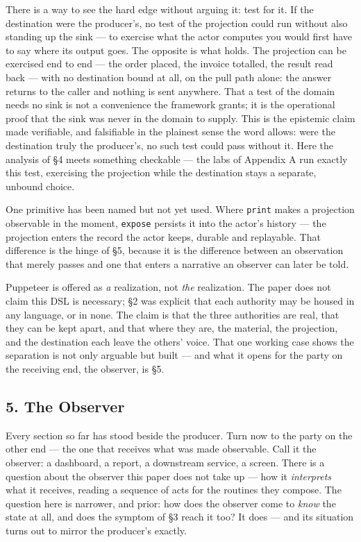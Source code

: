 \documentclass[
]{article}
\newcounter{none} %
\begin{document}
There is a way to see the hard edge without arguing it: test for it. If
the destination were the producer's, no test of the projection could run
without also standing up the sink --- to exercise what the actor
computes you would first have to say where its output goes. The opposite
is what holds. The projection can be exercised end to end --- the order
placed, the invoice totalled, the result read back --- with no
destination bound at all, on the pull path alone: the answer returns to
the caller and nothing is sent anywhere. That a test of the domain needs
no sink is not a convenience the framework grants; it is the operational
proof that the sink was never in the domain to supply. This is the
epistemic claim made verifiable, and falsifiable in the plainest sense
the word allows: were the destination truly the producer's, no such test
could pass without it. Here the analysis of §4 meets something checkable
--- the labs of Appendix A run exactly this test, exercising the
projection while the destination stays a separate, unbound choice.

One primitive has been named but not yet used. Where \texttt{print}
makes a projection observable in the moment, \texttt{expose} persists it
into the actor's history --- the projection enters the record the actor
keeps, durable and replayable. That difference is the hinge of §5,
because it is the difference between an observation that merely passes
and one that enters a narrative an observer can later be told.

Puppeteer is offered as \emph{a} realization, not \emph{the}
realization. The paper does not claim this DSL is necessary; §2 was
explicit that each authority may be housed in any language, or in none.
The claim is that the three authorities are real, that they can be kept
apart, and that where they are, the material, the projection, and the
destination each leave the others' voice. That one working case shows
the separation is not only arguable but built --- and what it opens for
the party on the receiving end, the observer, is §5.

\subsection{5. The Observer}\label{the-observer}

Every section so far has stood beside the producer. Turn now to the
party on the other end --- the one that receives what was made
observable. Call it the observer: a dashboard, a report, a downstream
service, a screen. There is a question about the observer this paper
does not take up --- how it \emph{interprets} what it receives, reading
a sequence of acts for the routines they compose. The question here is
narrower, and prior: how does the observer come to \emph{know} the state
at all, and does the symptom of §3 reach it too? It does --- and its
situation turns out to mirror the producer's exactly.
\end{document}
